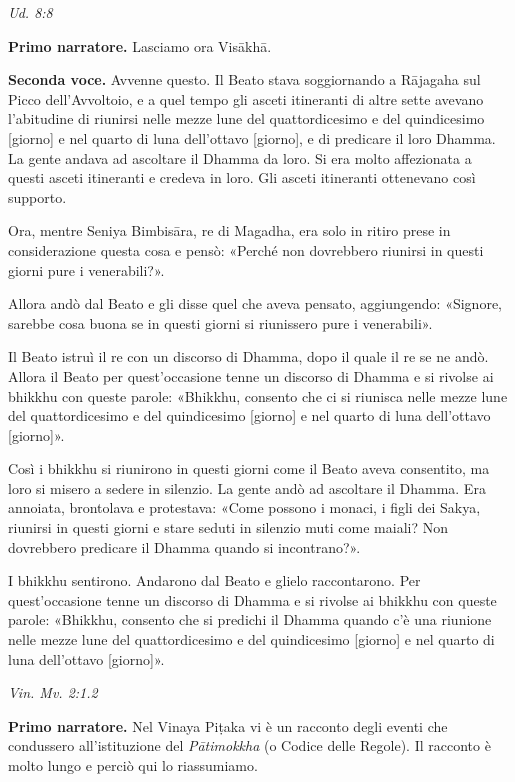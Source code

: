 \emph{Ud. 8:8}


\textbf{Primo narratore.} Lasciamo ora Visākhā.


\textbf{Seconda voce.} Avvenne questo. Il Beato stava soggiornando a Rājagaha sul
Picco dell’Avvoltoio, e a quel tempo gli asceti itineranti di altre
sette avevano l’abitudine di riunirsi nelle mezze lune del
quattordicesimo e del quindicesimo [giorno] e nel quarto di luna
dell’ottavo [giorno], e di predicare il loro Dhamma. La gente andava ad
ascoltare il Dhamma da loro. Si era molto affezionata a questi asceti
itineranti e credeva in loro. Gli asceti itineranti ottenevano così
supporto.


Ora, mentre Seniya Bimbisāra, re di Magadha, era solo in ritiro prese in
considerazione questa cosa e pensò: «Perché non dovrebbero riunirsi in
questi giorni pure i venerabili?».


Allora andò dal Beato e gli disse quel che aveva pensato, aggiungendo:
«Signore, sarebbe cosa buona se in questi giorni si riunissero pure i
venerabili».


Il Beato istruì il re con un discorso di Dhamma, dopo il quale il re se
ne andò. Allora il Beato per quest’occasione tenne un discorso di Dhamma
e si rivolse ai bhikkhu con queste parole: «Bhikkhu, consento che ci si
riunisca nelle mezze lune del quattordicesimo e del quindicesimo
[giorno] e nel quarto di luna dell’ottavo [giorno]».


Così i bhikkhu si riunirono in questi giorni come il Beato aveva
consentito, ma loro si misero a sedere in silenzio. La gente andò ad
ascoltare il Dhamma. Era annoiata, brontolava e protestava: «Come
possono i monaci, i figli dei Sakya, riunirsi in questi giorni e stare
seduti in silenzio muti come maiali? Non dovrebbero predicare il Dhamma
quando si incontrano?».


I bhikkhu sentirono. Andarono dal Beato e glielo raccontarono. Per
quest’occasione tenne un discorso di Dhamma e si rivolse ai bhikkhu con
queste parole: «Bhikkhu, consento che si predichi il Dhamma quando c’è
una riunione nelle mezze lune del quattordicesimo e del quindicesimo
[giorno] e nel quarto di luna dell’ottavo [giorno]».


\emph{Vin. Mv. 2:1.2}


\textbf{Primo narratore.} Nel Vinaya Piṭaka vi è un racconto degli eventi che
condussero all’istituzione del \emph{Pātimokkha} (o Codice delle Regole). Il
racconto è molto lungo e perciò qui lo riassumiamo.


